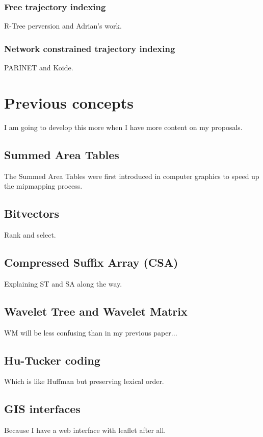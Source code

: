 \documentclass{UniVieCS_PhD} %
\begin{document}
	\subsubsection{Free trajectory indexing}
	R-Tree perversion and Adrian's work.
	
	\subsubsection{Network constrained trajectory indexing}
	PARINET and Koide.
	
	\section{Previous concepts}
	I am going to develop this more when I have more content on my proposals.
	
	\subsection{Summed Area Tables}
	The Summed Area Tables were first introduced in computer graphics \cite{crow1984summed} to speed up the mipmapping process.
	
	\subsection{Bitvectors}
	Rank and select.
	
	\subsection{Compressed Suffix Array (CSA)}
	Explaining ST and SA along the way.
	
	\subsection{Wavelet Tree and Wavelet Matrix}
	WM will be less confusing than in my previous paper...
	
	\subsection{Hu-Tucker coding}
	Which is like Huffman but preserving lexical order.
	
	\subsection{GIS interfaces}
	Because I have a web interface with leaflet after all.
	
\end{document}
